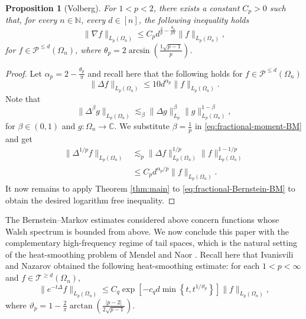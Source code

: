 \documentclass{amsart}
\numberwithin{equation}{section}
\newtheorem{prop}[thm]{Proposition}
\theoremstyle{definition}
\theoremstyle{remark}
\newcommand{\1}{\mathbf 1}
\begin{document}
\begin{prop}[Volberg]\label{prop:log-free-BM}
For $1<p<2$, there exists a constant $C_{p}>0$ such that, for every
$n\in\mathbb N$, every $d\in  [n]$, the following inequality holds
\[
 \|\nabla f\|_{L_{p}(\Omega_n)}
 \leq
 C_{p}
 d^{\frac{2}{p}-\frac{\theta_{p}}{p\pi}}
 \|f\|_{L_{p}(\Omega_n)},
\]
for $f\in \mathcal{P}^{\leq d}(\Omega_{n})$, where $\theta_{p}=2\arcsin\left(\frac{1\sqrt{p-1}}{p}\right)$.
\end{prop}
\begin{proof}
Let $ \alpha_{p}=2-\frac{\theta_{p}}{\pi}$ and recall here that the following holds for $f\in \mathcal{P}^{\leq d}(\Omega_{n})$
\[
 \|\Delta f\|_{L_{p}(\Omega_{n})} \leq 10d^{\alpha_{p}}\|f\|_{L_{p}(\Omega_{n})}.
 \tag{1}
 \label{eq:BM-Delta}
\]
Note that
\begin{equation}\label{eq:fractional-moment-BM}
 \|\Delta^{\beta}g\|_{L_{p}(\Omega_{n})} \lesssim_{\beta} \|\Delta g\|_{L_{p}}^{\beta}\|g\|_{L_{p}(\Omega_{n})}^{1-\beta},
\end{equation}
for $\beta\in (0,1)$ and $g:\Omega_{n}\to \mathbb{C}$.  We substitute $\beta=\frac{1}{p}$ in \eqref{eq:fractional-moment-BM} and get
\begin{equation}\label{eq:fractional-Bernstein-BM}
\begin{split}
\|\Delta^{1/p}f\|_{L_{p}(\Omega_{n})}&\lesssim_{p}\|\Delta f\|_{L_{p}(\Omega_{n})}^{1/p}\|f\|_{L_{p}(\Omega_{n})}^{1-1/p}\\
&\leq C_{p} d^{\alpha_{p}/p}\|f\|_{L_{p}(\Omega_{n})}.
\end{split}
\end{equation}
It now remains to apply Theorem \ref{thm:main} to \eqref{eq:fractional-Bernstein-BM} to obtain the desired logarithm free inequality.
\end{proof}


The Bernstein--Markov estimates considered above concern functions whose
Walsh spectrum is bounded from above.  We now conclude this paper with the complementary high-frequency regime of tail spaces, which is the natural setting of the heat-smoothing problem of Mendel and Naor \cite{M-N2014}. Recall here that Ivanisvili and Nazarov \cite{I-N2022} obtained the following heat-smoothing estimate: for each $1<p<\infty$ and $ f\in\mathcal{T}^{\geq d}(\Omega_{n})$, 
\begin{equation}\label{eq:tail-heat-smoothing}
 \|e^{-t\Delta}f\|_{L_{p}(\Omega_{n})}\le C_q\exp\!\left[-c_qd\min\left\{t,t^{1/\vartheta_p}\right\}\right]\|f\|_{L_{p}(\Omega_{n})},
\end{equation}
where $\vartheta_p=1-\frac{2}{\pi}\arctan\!\left(\frac{|p-2|}{2\sqrt{p-1}}\right)$.
\end{document}
